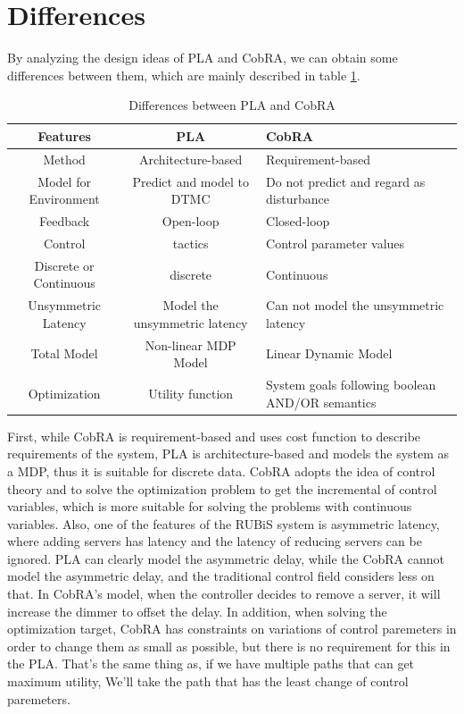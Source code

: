 \documentclass[sigconf]{acmart}
\begin{document}
\section{Differences}
By analyzing the design ideas of PLA  and CobRA, we can obtain some differences between them, which are mainly described in table \ref{tab:differences}.
\begin{table}
	\caption{Differences between PLA and CobRA}
	\label{tab:differences}
	\begin{tabular}{ccl}
		\toprule
		Features&PLA&CobRA\\
		\midrule
		Method & Architecture-based& Requirement-based\\
		Model for Environment & Predict and model to DTMC
		& Do not predict and regard as disturbance 
		\\
		Feedback & Open-loop
		 & Closed-loop\\
		Control  & tactics& Control parameter values
		\\
		Discrete or Continuous&discrete&Continuous\\
		Unsymmetric Latency&Model the unsymmetric latency&Can not model the unsymmetric latency
		\\
		Total Model&Non-linear MDP Model&Linear Dynamic Model\\
		Optimization&Utility function&System goals following boolean AND/OR semantics\\
		
		\bottomrule
	\end{tabular}
\end{table}

First, while CobRA is requirement-based and uses cost function to describe requirements of the system, PLA is architecture-based and models the system as a MDP, thus it is suitable for discrete data. 
CobRA adopts the idea of control theory and to solve the optimization problem to get the incremental of control variables, which is more suitable for solving the problems with continuous variables. Also, one of the features of the RUBiS system is asymmetric latency, where adding servers has latency and the latency of reducing servers can be ignored.
PLA can clearly model the asymmetric delay, while the CobRA cannot model the asymmetric delay, and the traditional control field considers less on that. In CobRA's model, when the controller decides to remove a server, it will increase the dimmer to offset the delay.
In addition, when solving the optimization target, CobRA has constraints on variations of control paremeters in order to change them as small as possible, but there is no requirement for this in the PLA.
That's the same thing as, if we have multiple paths that can get maximum utility, We'll take the path that has the least change of control paremeters.
\end{document}

